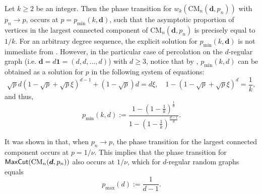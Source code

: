 \documentclass[11pt,a4paper, reqno]{article}
\numberwithin{equation}{section}
\numberwithin{equation}{section}
\newcommand{\1}{\ensuremath{\mathbbm{1}}}
\newcommand{\bld}[1]{\boldsymbol{#1}}
\newcommand{\Mcut}{{\sf{MaxCut}}}
\numberwithin{equation}{section}
\numberwithin{theorem}{section}
\begin{document}
Let $k\geq 2$ be an integer.
Then the phase transition for $w_k(\mathrm{CM}_n(\bld{d},p_n))$ with $p_n\to p$, occurs at $p=p_{\min}(k,\bld{d})$, such that the asymptotic proportion of vertices in the largest connected component of $\mathrm{CM}_n(\bld{d},p_n)$ is precisely equal to $1/k$. 
For an arbitrary degree sequence, the explicit solution for $p_{\min}(k,\bld{d})$ is not immediate from \cite[Theorem 3.9]{J09}. 
However, in the particular case of percolation on the $d$-regular graph (i.e. $\bld{d} = d\bld{1} = (d,d,\dots,d)$) with $d\geq 3$, notice that by \cite[(3.13),(3.14)]{J09}, $p_{\min}(k,d)$ can be obtained as a solution for $p$ in the following system of equations:
\begin{equation}
 \sqrt{p}d(1-\sqrt{p}+\sqrt{p}\xi)^{d-1}+(1-\sqrt{p})d = d\xi, \quad 1-(1-\sqrt{p}+\sqrt{p}\xi)^{d}=\frac{1}{k},
\end{equation}and thus,
\begin{equation}
 p_{\min}(k,d) := \frac{1-\left(1-\frac{1}{k}\right)^{\frac{1}{d}}}{1-\left(1-\frac{1}{k}\right)^{\frac{d-1}{d}}}.
\end{equation}

It was shown in \cite[Theorem 3.9]{J09} that, when $p_n\to p$, the phase transition for the largest connected component occurs at $p=1/\nu$. 
This implies that the phase transition for $\Mcut(\mathrm{CM}_n(\bld{d},p_n))$ also occurs at $1/\nu$, which for $d$-regular random graphs equals
\begin{equation}
p_{\max}(d):=\frac{1}{d-1}.
\end{equation}
\end{document}
